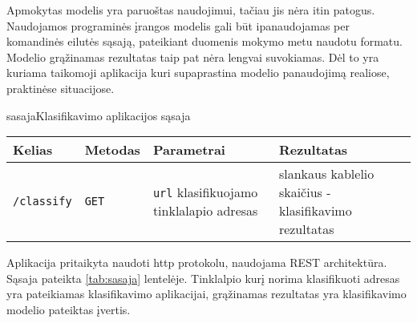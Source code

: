 
Apmokytas modelis yra paruoštas naudojimui, tačiau jis nėra itin patogus. Naudojamos programinės įrangos modelis gali būt ipanaudojamas per komandinės eilutės sąsają, pateikiant duomenis mokymo metu naudotu formatu. Modelio grąžinamas rezultatas taip pat nėra lengvai suvokiamas. Dėl to yra kuriama taikomoji aplikacija kuri supaprastina modelio panaudojimą realiose, praktinėse situacijose.

\begin{ktutable}{sasaja}{Klasifikavimo aplikacijos sąsaja}
    \begin{tabular}{|l|l|p{5cm}|p{5cm}|}
    \hline
        Kelias & Metodas & Parametrai & Rezultatas \\ \hline
        \texttt{/classify} & \texttt{GET} & \texttt{url} klasifikuojamo tinklalapio adresas & slankaus kablelio skaičius - klasifikavimo rezultatas \\ \hline
    \end{tabular}
\end{ktutable}

Aplikacija pritaikyta naudoti http protokolu, naudojama REST architektūra. Sąsaja pateikta \vref{tab:sasaja} lentelėje. Tinklalpio kurį norima klasifikuoti adresas yra pateikiamas klasifikavimo aplikacijai, grąžinamas rezultatas yra klasifikavimo modelio pateiktas įvertis.